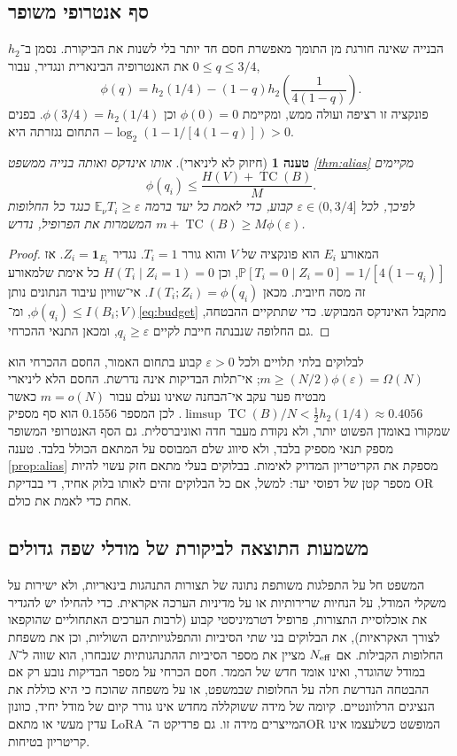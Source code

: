 \documentclass[11pt,a4paper]{article}
\newtheorem{proposition}[theorem]{טענה}
\theoremstyle{definition}
\theoremstyle{remark}
\newcommand{\TC}{\operatorname{TC}}
\newcommand{\EN}[1]{\textenglish{#1}}
\newcommand{\Prb}{\mathbb P}
\begin{document}
\subsection{סף אנטרופי משופר}
הבנייה שאינה חורגת מן התומך מאפשרת חסם חד יותר בלי לשנות את הביקורת. נסמן ב־$h_2$ את האנטרופיה הבינארית ונגדיר, עבור $0\le q\le3/4$,
\begin{equation}\label{eq:phi}
\phi(q)=h_2(1/4)-(1-q)h_2\!\left(\frac{1}{4(1-q)}\right).
\end{equation}
פונקציה זו רציפה ועולה ממש, ומקיימת $\phi(0)=0$ וכן $\phi(3/4)=h_2(1/4)$. בפנים התחום נגזרתה היא $-\log_2(1-1/[4(1-q)])>0$.
\begin{proposition}[חיזוק לא ליניארי]\label{prop:nonlinear}
אותו אינדקס ואותה בנייה ממשפט \ref{thm:alias} מקיימים
\[
\phi(q_i)\le\frac{H(V)+\TC(B)}{M}.
\]
לפיכך, לכל $\varepsilon\in(0,3/4]$ קבוע, כדי לאמת כל יעד ברמה $\mathbb E_\nu T_i\ge\varepsilon$ כנגד כל החלופות המשמרות את הפרופיל, נדרש $m+\TC(B)\ge M\phi(\varepsilon)$.
\end{proposition}
\begin{proof}
המאורע $E_i$ הוא פונקציה של $V$ והוא גורר $T_i=1$. נגדיר $Z_i=\mathbf 1_{E_i}$. אז $\Prb[T_i=0\mid Z_i=0]=1/[4(1-q_i)]$, וכן $H(T_i\mid Z_i=1)=0$ כל אימת שלמאורע זה מסה חיובית. מכאן $I(T_i;Z_i)=\phi(q_i)$. אי־שוויון עיבוד הנתונים נותן $\phi(q_i)\le I(B_i;V)$, ומ־\eqref{eq:budget} מתקבל האינדקס המבוקש. כדי שתתקיים ההבטחה, גם החלופה שנבנתה חייבת לקיים $q_i\ge\varepsilon$, ומכאן התנאי ההכרחי.
\end{proof}
לבלוקים בלתי תלויים ולכל $\varepsilon>0$ קבוע בתחום האמור, החסם ההכרחי הוא $m\ge (N/2)\phi(\varepsilon)=\Omega(N)$; אי־תלות הבדיקות אינה נדרשת. החסם הלא ליניארי מבטיח פער עקב אי־הבחנה שאינו נעלם עבור $m=o(N)$ כאשר $\limsup\TC(B)/N<\tfrac12 h_2(1/4)\approx0.4056$. לכן המספר $0.1556$ הוא סף מספיק שמקורו באומדן הפשוט יותר, ולא נקודת מעבר חדה ואוניברסלית. גם הסף האנטרופי המשופר מספק תנאי מספיק בלבד, ולא סיווג שלם המבוסס על המתאם הכולל בלבד. טענה \ref{prop:alias} מספקת את הקריטריון המדויק לאימות. בבלוקים בעלי מתאם חזק עשוי להיות מספר קטן של דפוסי יעד: למשל, אם כל הבלוקים זהים לאותו בלוק אחיד, די בבדיקת \EN{OR} אחת כדי לאמת את כולם.

\subsection{משמעות התוצאה לביקורת של מודלי שפה גדולים}
המשפט חל על התפלגות משותפת נתונה של תצורות התנהגות בינאריות, ולא ישירות על משקלי המודל, על הנחיות שרירותיות או על מדיניות הערכה אקראית. כדי להחילו יש להגדיר את אוכלוסיית התצורות, פרופיל דטרמיניסטי קבוע (לרבות הערכים האתחוליים שהוקפאו לצורך האקראיות), את הבלוקים בני שתי הסיביות והתפלגויותיהם השוליות, וכן את משפחת החלופות הקבילות. אם $N_{\rm eff}$ מציין את מספר הסיביות ההתנהגותיות שנבחרו, הוא שווה ל־$N$ במודל שהוגדר, ואינו אומד חדש של הממד. חסם הכרחי על מספר הבדיקות נובע רק אם ההבטחה הנדרשת חלה על החלופות שבמשפט, או על משפחה שהוכח כי היא כוללת את הנציגים הרלוונטיים. קיומה של מידה ששוקללה מחדש אינו גורר קיום של מודל יחיד, כוונון עדין מעשי או מתאם \EN{LoRA} המייצרים מידה זו. גם פרדיקט ה־\EN{OR} המופשט כשלעצמו אינו קריטריון בטיחות.
\end{document}
